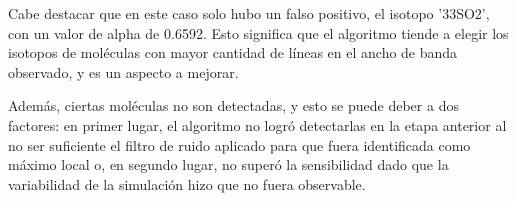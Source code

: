 Cabe destacar que en este caso solo hubo un falso positivo, el isotopo '33SO2', con un valor de alpha de 0.6592. Esto significa que el algoritmo tiende a elegir los isotopos de moléculas con mayor cantidad de líneas en el ancho de banda observado, y es un aspecto a mejorar. 

Además, ciertas moléculas no son detectadas, y esto se puede deber a dos factores: en primer lugar, el algoritmo no logró detectarlas en la etapa anterior al no ser suficiente el filtro de ruido aplicado para que fuera identificada como máximo local o, en segundo lugar, no superó la sensibilidad dado que la variabilidad de la simulación hizo que no fuera observable. 







